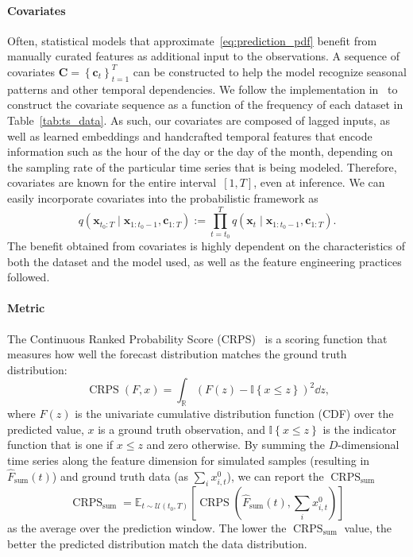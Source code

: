 \paragraph{Covariates}
Often, statistical models that approximate~\eqref{eq:prediction_pdf} benefit from manually curated features as additional input to the observations. A sequence of covariates $\boldsymbol{C} = \left\{ \mathbf{c}_t \right\}_{t=1}^T$ can be constructed to help the model recognize seasonal patterns and other temporal dependencies. We follow the implementation in~\cite{rasul2021multivariate} to construct the covariate sequence as a function of the frequency of each dataset in Table~\ref{tab:ts_data}. As such, our covariates are composed of lagged inputs, as well as learned embeddings and handcrafted temporal features that encode information such as the hour of the day or the day of the month, depending on the sampling rate of the particular time series that is being modeled. Therefore, covariates are known for the entire interval~$\left[1, T\right]$, even at inference. We can easily incorporate covariates into the probabilistic framework as
\begin{equation} \label{eq:prediction_pdf_covariates}
    q{\left( \mathbf{x}_{t_0:T} \mid \mathbf{x}_{1:t_0-1}, \mathbf{c}_{1:T} \right)} := \prod_{t=t_0}^T{q{\left( \mathbf{x}_t \mid \mathbf{x}_{1:t_0-1}, \mathbf{c}_{1:T} \right)}} \text{.}
\end{equation}
The benefit obtained from covariates is highly dependent on the characteristics of both the dataset and the model used, as well as the feature engineering practices followed.


\paragraph{Metric}
The Continuous Ranked Probability Score (CRPS)~\cite{james1976scoring} is a scoring function that measures how well the forecast distribution matches the ground truth distribution:
\begin{equation*}
    \operatorname{CRPS}(F, x) = \int_\mathbb{R} \left(F(z) - \mathbb{I}\left\{ x \leq z \right\} \right)^2 \dd{z} \text{,}
\end{equation*}
where $F(z)$ is the univariate cumulative distribution function (CDF) over the predicted value, $x$ is a ground truth observation, and $\mathbb{I}\left\{ x \leq z \right\}$ is the indicator function that is one if $x \leq z$ and zero otherwise. By summing the $D$-dimensional time series along the feature dimension for simulated samples (resulting in $\hat{F}_\text{sum}(t)$) and ground truth data (as $\sum_i x^0_{i,t}$), we can report the $\operatorname{CRPS}_\text{sum}$
\begin{equation*}
    \operatorname{CRPS}_\text{sum} = \mathbb{E}_{t \sim \mathcal{U}\left(t_0, T\right)} \left[\operatorname{CRPS}{\left(\hat{F}_\text{sum}(t), \sum_i x^0_{i,t} \right)}\right]
\end{equation*}
as the average over the prediction window. The lower the $\operatorname{CRPS}_\text{sum}$ value, the better the predicted distribution match the data distribution.

